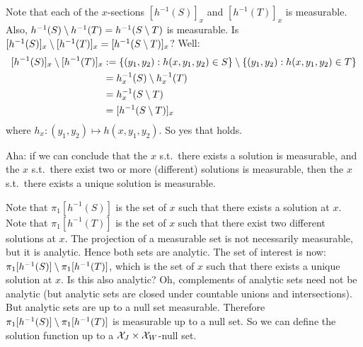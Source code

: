 {  Note that each of the $x$-sections $[h^{-1}(S)]_x$ and $[h^{-1}(T)]_x$ is measurable.
  Also, $h^{-1}(S) \setminus h^{-1}(T) = h^{-1}(S \setminus T)$ is measurable.
  Is $[h^{-1}(S)]_x \setminus [h^{-1}(T)]_x = [h^{-1}(S \setminus T)]_x$?
  Well: 
  \begin{equation*}\begin{split}
    [h^{-1}(S)]_x \setminus [h^{-1}(T)]_x 
    &:= \{(y_1,y_2) : h(x,y_1,y_2) \in S\} \setminus \{(y_1,y_2) : h(x,y_1,y_2) \in T\} \\
    &= h_x^{-1}(S) \setminus h_x^{-1}(T)  \\
    &= h_x^{-1}(S \setminus T) \\
    &= [h^{-1}(S \setminus T)]_x
  \end{split}\end{equation*}
  where $h_x : (y_1,y_2) \mapsto h(x,y_1,y_2)$.
  So yes that holds.
  
  Aha: if we can conclude that the $x$ s.t.\ there exists a solution is measurable,
  and the $x$ s.t.\ there exist two or more (different) solutions is measurable,
  then the $x$ s.t.\ there exists a unique solution is measurable.

  Note that $\pi_1[h^{-1}(S)]$ is the set of $x$ such that there exists a solution at $x$.
  Note that $\pi_1[h^{-1}(T)]$ is the set of $x$ such that there exist two different solutions at $x$.
  The projection of a measurable set is not necessarily measurable, but it is analytic.
  Hence both sets are analytic.
  The set of interest is now:
  $\pi_1[h^{-1}(S)] \setminus \pi_1[h^{-1}(T)]$,
  which is the set of $x$ such that there exists a unique solution at $x$.
  Is this also analytic?
  Oh, complements of analytic sets need not be analytic (but analytic sets are closed under countable unions and intersections).
  But analytic sets are up to a null set measurable.
  Therefore $\pi_1[h^{-1}(S)] \setminus \pi_1[h^{-1}(T)]$ is measurable up to a null set.
  So we can define the solution function up to a $\mathcal{X}_J \times \mathcal{X}_W$-null set.

}
